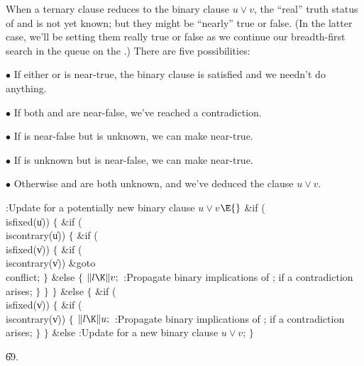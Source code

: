When a ternary clause reduces to the binary clause $u\lor
v$,
the ``real'' truth status of  and  is not yet known; but they
might be ``nearly'' true or false. (In the latter case, we'll be
setting them really true or false as we continue our
breadth-first search in the queue on the .) There are
five possibilities:
\smallskip
\item{$\bullet$}
If either  or  is near-true, the binary clause is satisfied
and we needn't do anything.
\smallskip
\item{$\bullet$}
If both  and  are near-false, we've reached a contradiction.
\smallskip
\item{$\bullet$}
If  is near-false but  is unknown, we can make 
near-true.
\smallskip
\item{$\bullet$}
If  is unknown but  is near-false, we can make 
near-true.
\smallskip
\item{$\bullet$}
Otherwise  and  are both unknown, and we've deduced the clause
$u\lor v$.

\Y\B\4:Update for a potentially new binary clause $u\lor v$\X${}\E{}$\6
\&{if} (\\{isfixed}(\|u))\5
${}\{{}$\1\6
\&{if} (\\{iscontrary}(\|u))\5
${}\{{}$\1\6
\&{if} (\\{isfixed}(\|v))\5
${}\{{}$\1\6
\&{if} (\\{iscontrary}(\|v))\1\5
\&{goto} \\{conflict};\2\6
\4${}\}{}$\5
\2\&{else}\5
${}\{{}$\1\6
${}\|l\K\|v;{}$\6
:Propagate binary implications of ;  if a
contradiction arises\X;\6
\4${}\}{}$\2\6
\4${}\}{}$\2\6
\4${}\}{}$\5
\2\&{else}\5
${}\{{}$\1\6
\&{if} (\\{isfixed}(\|v))\5
${}\{{}$\1\6
\&{if} (\\{iscontrary}(\|v))\5
${}\{{}$\1\6
${}\|l\K\|u;{}$\6
:Propagate binary implications of ;  if a
contradiction arises\X;\6
\4${}\}{}$\2\6
\4${}\}{}$\5
\2\&{else}\1\5
:Update for a new binary clause $u\lor v$\X;\2\6
\4${}\}{}$\2\par
\U69.\fi

